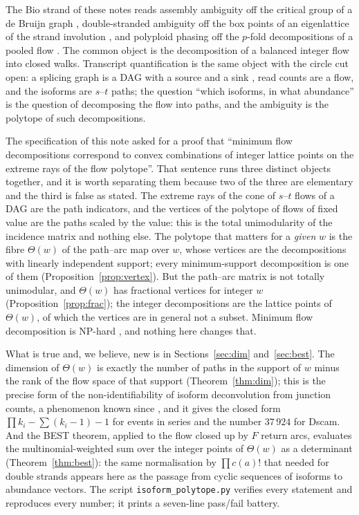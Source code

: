 \documentclass[11pt]{article}
\theoremstyle{plain}
\theoremstyle{definition}
\theoremstyle{remark}
\newcommand{\Th}{\Theta}
\begin{document}
The Bio strand of these notes reads assembly ambiguity off the critical group of a de Bruijn
graph \cite{Bio1}, double-stranded ambiguity off the box points of an eigenlattice of the
strand involution \cite{Bio8}, and polyploid phasing off the $p$-fold decompositions of a
pooled flow \cite{Bio9}. The common object is the decomposition of a balanced integer flow
into closed walks. Transcript quantification is the same object with the circle cut open: a
splicing graph is a DAG with a source and a sink \cite{HAST02}, read counts are a flow, and
the isoforms are $s$--$t$ paths; the question ``which isoforms, in what abundance'' is the
question of decomposing the flow into paths, and the ambiguity is the polytope of such
decompositions.

The specification of this note asked for a proof that ``minimum flow decompositions
correspond to convex combinations of integer lattice points on the extreme rays of the flow
polytope''. That sentence runs three distinct objects together, and it is worth separating
them because two of the three are elementary and the third is false as stated. The extreme
rays of the cone of $s$--$t$ flows of a DAG are the path indicators, and the vertices of the
polytope of flows of fixed value are the paths scaled by the value: this is the total
unimodularity of the incidence matrix and nothing else. The polytope that matters for a
\emph{given} $w$ is the fibre $\Th(w)$ of the path--arc map over $w$, whose vertices are the
decompositions with linearly independent support; every minimum-support decomposition is one
of them (Proposition~\ref{prop:vertex}). But the path--arc matrix is not totally unimodular,
and $\Th(w)$ has fractional vertices for integer $w$ (Proposition~\ref{prop:frac}); the
integer decompositions are the lattice points of $\Th(w)$, of which the vertices are in
general not a subset. Minimum flow decomposition is NP-hard \cite{HHKS12}, and nothing here
changes that.

What is true and, we believe, new is in Sections~\ref{sec:dim} and~\ref{sec:best}. The
dimension of $\Th(w)$ is exactly the number of paths in the support of $w$ minus the rank of
the flow space of that support (Theorem~\ref{thm:dim}); this is the precise form of the
non-identifiability of isoform deconvolution from junction counts, a phenomenon known since
\cite{LSGB08,HJXW09}, and it gives the closed form $\prod k_i-\sum(k_i-1)-1$ for events in
series and the number $37\,924$ for Dscam. And the BEST theorem, applied to the flow closed
up by $F$ return arcs, evaluates the multinomial-weighted sum over the integer points of
$\Th(w)$ as a determinant (Theorem~\ref{thm:best}): the same normalisation by
$\prod c(a)!$ that \cite{Bio8} needed for double strands appears here as the passage from
cyclic sequences of isoforms to abundance vectors. The script
\texttt{isoform\_polytope.py} verifies every statement and reproduces every number; it prints
a seven-line pass/fail battery.
\end{document}

